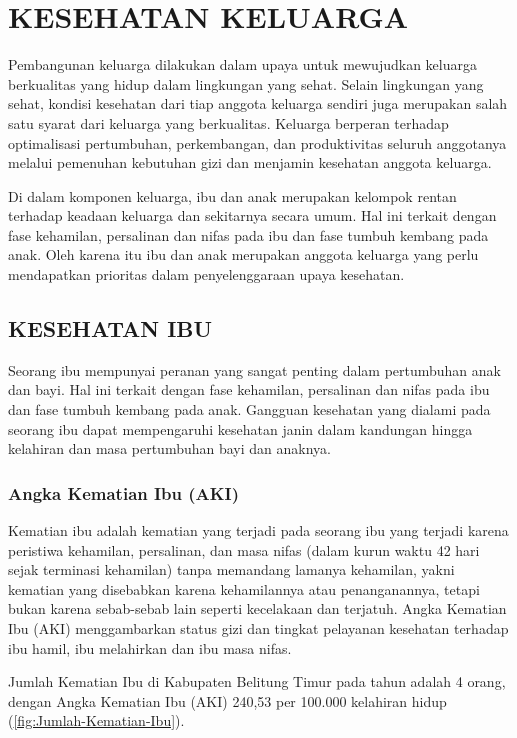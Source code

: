\chapter{KESEHATAN KELUARGA}

Pembangunan keluarga dilakukan dalam upaya untuk mewujudkan keluarga berkualitas yang hidup dalam lingkungan yang sehat. Selain lingkungan yang sehat, kondisi kesehatan dari tiap anggota keluarga sendiri juga merupakan salah satu syarat dari keluarga yang berkualitas.
Keluarga berperan terhadap optimalisasi pertumbuhan, perkembangan, dan produktivitas seluruh anggotanya melalui pemenuhan kebutuhan gizi dan menjamin kesehatan anggota keluarga. 

Di dalam komponen keluarga, ibu dan anak merupakan kelompok rentan terhadap keadaan keluarga dan sekitarnya secara umum.
Hal ini terkait dengan fase kehamilan, persalinan dan nifas pada ibu dan fase tumbuh kembang pada anak.
Oleh karena itu ibu dan anak merupakan anggota keluarga yang perlu mendapatkan prioritas dalam penyelenggaraan upaya kesehatan.

\section{KESEHATAN IBU}
Seorang ibu mempunyai peranan yang sangat penting dalam pertumbuhan anak dan bayi.
Hal ini terkait dengan fase kehamilan, persalinan dan nifas pada ibu dan fase tumbuh kembang pada anak.
Gangguan kesehatan yang dialami pada seorang ibu dapat mempengaruhi kesehatan janin dalam kandungan hingga kelahiran dan masa pertumbuhan bayi dan anaknya.

\subsection{Angka Kematian Ibu (AKI)}
Kematian ibu adalah kematian yang terjadi pada seorang ibu yang terjadi karena peristiwa kehamilan, persalinan, dan masa nifas (dalam kurun waktu 42 hari sejak terminasi kehamilan) tanpa memandang lamanya kehamilan, yakni kematian yang disebabkan karena kehamilannya atau penanganannya, tetapi bukan karena sebab-sebab lain seperti kecelakaan dan terjatuh.
Angka Kematian Ibu (AKI) menggambarkan status gizi dan tingkat pelayanan kesehatan terhadap ibu hamil, ibu melahirkan dan ibu masa nifas.

Jumlah Kematian Ibu di Kabupaten Belitung Timur pada tahun \tP adalah 4 orang, dengan Angka Kematian Ibu (AKI) 240,53 per 100.000 kelahiran hidup (\autoref{fig:Jumlah-Kematian-Ibu}). 

